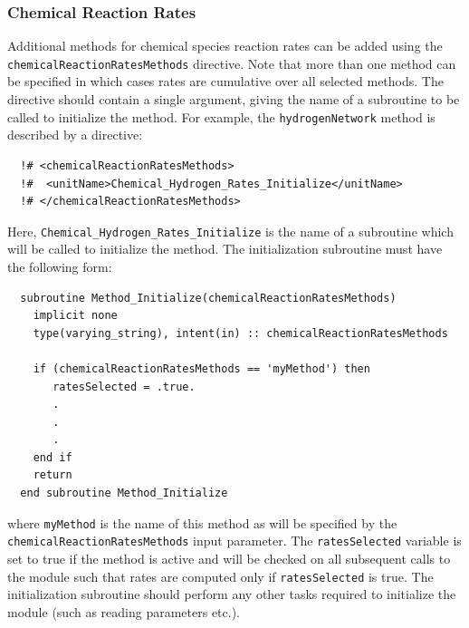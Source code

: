 \subsubsection{Chemical Reaction Rates}

Additional methods for chemical species reaction rates can be added using the {\tt chemicalReactionRatesMethods} directive. Note that more than one method can be specified in which cases rates are cumulative over all selected methods. The directive should contain a single argument, giving the name of a subroutine to be called to initialize the method. For example, the {\tt hydrogenNetwork} method is described by a directive:
\begin{verbatim}
  !# <chemicalReactionRatesMethods>
  !#  <unitName>Chemical_Hydrogen_Rates_Initialize</unitName>
  !# </chemicalReactionRatesMethods>
\end{verbatim}
Here, {\tt Chemical\_Hydrogen\_Rates\_Initialize} is the name of a subroutine which will be called to initialize the method. The initialization subroutine must have the following form:
\begin{verbatim}
  subroutine Method_Initialize(chemicalReactionRatesMethods)
    implicit none
    type(varying_string), intent(in) :: chemicalReactionRatesMethods
    
    if (chemicalReactionRatesMethods == 'myMethod') then
       ratesSelected = .true.
       .
       .
       .
    end if
    return
  end subroutine Method_Initialize
\end{verbatim}
where {\tt myMethod} is the name of this method as will be specified by the {\tt chemicalReactionRatesMethods} input parameter. The {\tt ratesSelected} variable is set to true if the method is active and will be checked on all subsequent calls to the module such that rates are computed only if {\tt ratesSelected} is true. The initialization subroutine should perform any other tasks required to initialize the module (such as reading parameters etc.).

